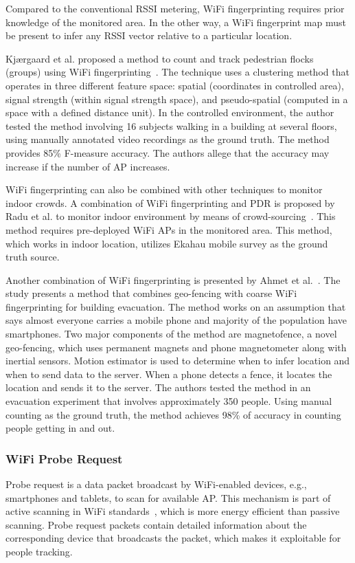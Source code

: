 	Compared to the conventional \ac{RSSI} metering, WiFi fingerprinting requires prior knowledge of the monitored area. In the other way, a WiFi fingerprint map must be present to infer any \ac{RSSI} vector relative to a particular location.

	Kj{\ae}rgaard et al. proposed a method to count and track pedestrian flocks (groups) using WiFi fingerprinting~\cite{thesis033}. The technique uses a clustering method that operates in three different feature space: spatial (coordinates in controlled area), signal strength (within signal strength space), and pseudo-spatial (computed in a space with a defined distance unit). In the controlled environment, the author tested the method involving 16 subjects walking in a building at several floors, using manually annotated video recordings as the ground truth. The method provides 85\% F-measure accuracy. The authors allege that the accuracy may increase if the number of \ac{AP} increases.

	WiFi fingerprinting can also be combined with other techniques to monitor indoor crowds. A combination of WiFi fingerprinting and \ac{PDR} is proposed by Radu et al. to monitor indoor environment by means of crowd-sourcing~\cite{thesis020}. This method requires pre-deployed WiFi \ac{AP}s in the monitored area. This method, which works in indoor location, utilizes Ekahau mobile survey as the ground truth source.

	Another combination of WiFi fingerprinting is presented by Ahmet et al.~\cite{thesis045}. The study presents a method that combines geo-fencing with coarse WiFi fingerprinting for building evacuation. The method works on an assumption that says almost everyone carries a mobile phone and majority of the population have smartphones. Two major components of the method are magnetofence, a novel geo-fencing, which uses permanent magnets and phone magnetometer along with inertial sensors. Motion estimator is used to determine when to infer location and when to send data to the server. When a phone detects a fence, it locates the location and sends it to the server. The authors tested the method in an evacuation experiment that involves approximately 350 people. Using manual counting as the ground truth, the method achieves 98\% of accuracy in counting people getting in and out.


	\subsubsection{WiFi Probe Request} %
	\label{ssub:wifi_probe_request}
	Probe request is a data packet broadcast by WiFi-enabled devices, e.g., smartphones and tablets, to scan for available \ac{AP}. This mechanism is part of active scanning in WiFi standards~\cite{thesis082}, which is more energy efficient than passive scanning. Probe request packets contain detailed information about the corresponding device that broadcasts the packet, which makes it exploitable for people tracking.

